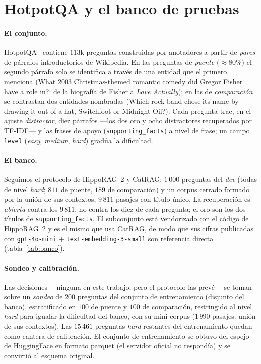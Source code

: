 \documentclass[11pt,a4paper]{article}
\newcommand{\hippo}{HippoRAG~2}
\newcommand{\gl}{\guillemotleft}
\newcommand{\gr}{\guillemotright}
\begin{document}
\section{HotpotQA y el banco de pruebas}
\label{sec:datos}

\paragraph{El conjunto.}
HotpotQA~\cite{hotpotqa} contiene $113$k preguntas construidas por
anotadores a partir de \emph{pares} de párrafos introductorios de Wikipedia.
En las preguntas de \emph{puente} ($\approx 80\%$) el segundo párrafo solo
se identifica a través de una entidad que el primero menciona (\gl{}What 2003
Christmas-themed romantic comedy did Gregor Fisher have a role in?\gr{}: de
la biografía de Fisher a \emph{Love Actually}); en las de \emph{comparación}
se contrastan dos entidades nombradas (\gl{}Which rock band chose its name by
drawing it out of a hat, Switchfoot or Midnight Oil?\gr{}). Cada pregunta
trae, en el ajuste \emph{distractor}, diez párrafos ---los dos oro y ocho
distractores recuperados por TF-IDF--- y las frases de apoyo
(\texttt{supporting\_facts}) a nivel de frase; un campo \texttt{level}
(\emph{easy}, \emph{medium}, \emph{hard}) gradúa la dificultad.

\paragraph{El banco.}
Seguimos el protocolo de \hippo{} y CatRAG: $1\,000$ preguntas del
\emph{dev} (todas de nivel \emph{hard}; $811$ de puente, $189$ de
comparación) y un corpus cerrado formado por la unión de sus contextos,
$9\,811$ pasajes con título único. La recuperación es \emph{abierta} contra
los $9\,811$, no contra los diez de cada pregunta; el oro son los dos títulos
de \texttt{supporting\_facts}. El subconjunto está vendorizado con el código
de \hippo{} y es el mismo que usa CatRAG, de modo que sus cifras publicadas
con \texttt{gpt-4o-mini} + \texttt{text-embedding-3-small} son referencia
directa (tabla~\ref{tab:banco}).

\paragraph{Sondeo y calibración.}
Las decisiones ---ninguna en este trabajo, pero el protocolo las prevé--- se
toman sobre un \emph{sondeo} de $200$ preguntas del conjunto de
entrenamiento (disjunto del banco), estratificado en $100$ de puente y $100$
de comparación, restringido al nivel \emph{hard} para igualar la dificultad
del banco, con su mini-corpus ($1\,990$ pasajes: unión de sus contextos). Las
$15\,461$ preguntas \emph{hard} restantes del entrenamiento quedan como
cantera de calibración. El conjunto de entrenamiento se obtuvo del espejo de
HuggingFace en formato parquet (el servidor oficial no respondía) y se
convirtió al esquema original.
\end{document}
